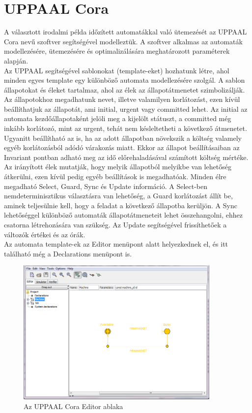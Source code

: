 \documentclass {report}
\begin{document}
\section{UPPAAL Cora}
A választott irodalmi példa időzített automatákkal való ütemezését az UPPAAL Cora nevű szoftver segítségével modelleztük. A szoftver alkalmas az automaták modellezésére, ütemezésére és optimalizálására meghatározott paraméterek alapján. \\
Az UPPAAL segítségével sablonokat (template-eket) hozhatunk létre, ahol minden egyes template egy különböző automata modellezésére szolgál. A sablon állapotokat és éleket tartalmaz, ahol az élek az állapotátmenetet szimbolizálják. \\
Az állapotokhoz megadhatunk nevet, illetve valamilyen korlátozást, ezen kívül beállíthatjuk az állapotát, ami initial, urgent vagy committed lehet. Az initial az automata kezdőállapotaként jelöli meg a kijelölt státuszt, a committed még inkább korlátozó, mint az urgent, tehát nem késleltetheti a következő átmenetet. Ugyanitt beállítható az is, ha az adott állapotban növekszik a költség valamely egyéb korlátozásból adódó várakozás miatt. Ekkor az állapot beállításaiban az Invariant pontban adható meg az idő előrehaladásával számított költség mértéke. \\
Az irányított élek mutatják, hogy melyik állapotból melyikbe van lehetőség átkerülni, ezen kívül pedig egyéb beállítások is megadhatóak. Minden élre megadható  Select, Guard, Sync és Update információ. A Select-ben nemdeterminisztikus választásra van lehetőség, a Guard korlátozást állít be, aminek teljesülnie kell, hogy a feladat a következő állapotba kerüljön. A Sync lehetőséggel különböző automaták állapotátmeneteit lehet összehangolni, ehhez csatorna létrehozására van szükség. Az Update segítségével frissíthetőek a változók értékei és az órák.\\
Az automata template-ek az Editor menüpont alatt helyezkednek el, és itt található még a Declarations menüpont is. 
\begin{figure}
\begin{center}
\includegraphics[width=10cm]{uppaal}
 \caption{Az UPPAAL Cora Editor ablaka}
\end{center}
\end{figure}
\end{document}
